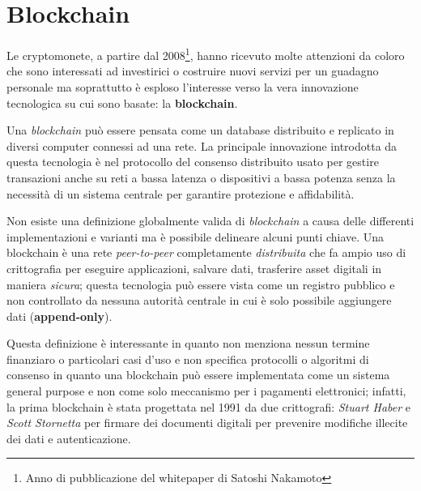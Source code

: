 \chapter{Blockchain}
Le cryptomonete, a partire dal 2008\footnote{Anno di pubblicazione del whitepaper di Satoshi Nakamoto}, hanno ricevuto molte attenzioni da coloro che sono interessati ad investirici o costruire nuovi servizi per un guadagno personale ma soprattutto è esploso l'interesse verso la vera innovazione tecnologica su cui sono basate: la \textbf{blockchain}.

Una \textit{blockchain} può essere pensata come un database distribuito e replicato in diversi computer connessi ad una rete.\newline
La principale innovazione introdotta da questa tecnologia è nel protocollo del consenso distribuito usato per gestire transazioni anche su reti a bassa latenza o dispositivi a bassa potenza senza la necessità di un sistema centrale per garantire protezione e affidabilità.

Non esiste una definizione globalmente valida di \textit{blockchain} a causa delle differenti implementazioni e varianti ma è possibile delineare alcuni punti chiave.\newline
Una blockchain è una rete \textit{peer-to-peer} completamente \textit{distribuita} che fa ampio uso di crittografia per eseguire applicazioni, salvare dati, trasferire asset digitali in maniera \textit{sicura}; questa tecnologia può essere vista come un registro pubblico e non controllato da nessuna autorità centrale in cui è solo possibile aggiungere dati (\textbf{append-only}).

Questa definizione è interessante in quanto non menziona nessun termine finanziaro o particolari casi d'uso e non specifica protocolli o algoritmi di consenso in quanto una blockchain può essere implementata come un sistema general purpose e non come solo meccanismo per i pagamenti elettronici; infatti, la prima blockchain è stata progettata nel 1991 da due crittografi: \textit{Stuart Haber} e \textit{Scott Stornetta} per firmare dei documenti digitali per prevenire modifiche illecite dei dati e autenticazione.\newline

